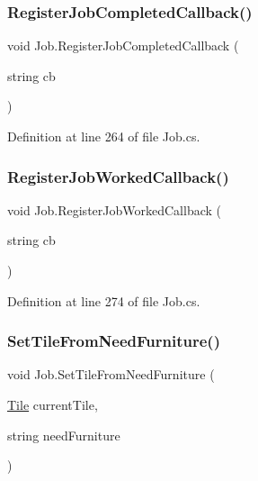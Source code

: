 \mbox{\label{class_job_ac763d2ee96f8dee66d67122dd1667bc4}} 
\subsubsection{\texorpdfstring{Register\+Job\+Completed\+Callback()}{RegisterJobCompletedCallback()}}
{\footnotesize\ttfamily void Job.\+Register\+Job\+Completed\+Callback (\begin{DoxyParamCaption}\item[{string}]{cb }\end{DoxyParamCaption})}



Definition at line 264 of file Job.\+cs.

\mbox{\label{class_job_ae6991b1a825e7f8dc2fa111d1a04cb7b}} 
\subsubsection{\texorpdfstring{Register\+Job\+Worked\+Callback()}{RegisterJobWorkedCallback()}}
{\footnotesize\ttfamily void Job.\+Register\+Job\+Worked\+Callback (\begin{DoxyParamCaption}\item[{string}]{cb }\end{DoxyParamCaption})}



Definition at line 274 of file Job.\+cs.

\mbox{\label{class_job_a4c742512928b31d7aed1751e3c110cf3}} 
\subsubsection{\texorpdfstring{Set\+Tile\+From\+Need\+Furniture()}{SetTileFromNeedFurniture()}}
{\footnotesize\ttfamily void Job.\+Set\+Tile\+From\+Need\+Furniture (\begin{DoxyParamCaption}\item[{\hyperlink{class_tile}{Tile}}]{current\+Tile,  }\item[{string}]{need\+Furniture }\end{DoxyParamCaption})}



